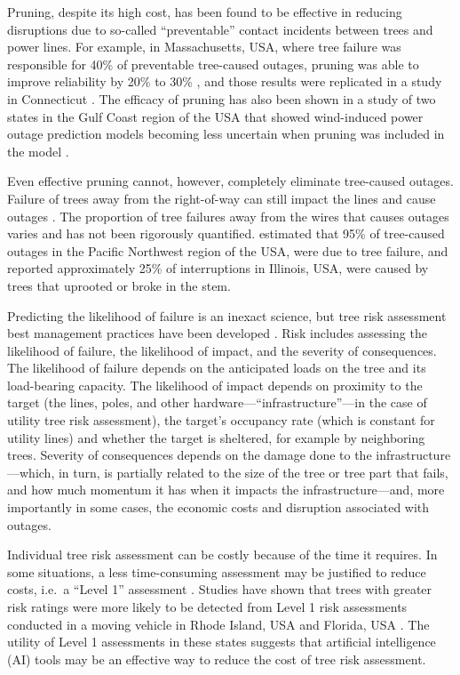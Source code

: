 \documentclass[Journal,letterpaper, SingleSpace, InsideFigs]{ascelike-new}
\begin{document}
Pruning, despite its high cost, has been found to be effective in reducing disruptions due to so-called ``preventable'' contact incidents between trees and power lines.  For example, in Massachusetts, USA, where tree failure was responsible for 40\% of preventable tree-caused outages, pruning was able to improve reliability by 20\% to 30\% \cite{simpson1996treecaused}, and those results were replicated in a study in Connecticut \cite{parent2019analysis}. The efficacy of pruning has also been shown in a study of two states in the Gulf Coast region of the USA that showed wind-induced power outage prediction models becoming less uncertain when pruning was included in the model \cite{nateghi2014power}.

Even effective pruning cannot, however, completely eliminate tree-caused outages. Failure of trees away from the right-of-way can still impact the lines and cause outages \cite{guggenmoos2003effects}. The proportion of tree failures away from the wires that causes outages varies and has not been rigorously quantified.  estimated that 95\% of tree-caused outages in the Pacific Northwest region of the USA, were due to tree failure, and  reported approximately 25\% of interruptions in Illinois, USA, were caused by trees that uprooted or broke in the stem. 


Predicting the likelihood of failure is an inexact science, but tree risk assessment best management practices have been developed \cite{smiley2017best,goodfellow2020best}. Risk includes assessing the likelihood of failure, the likelihood of impact, and the severity of consequences. The likelihood of failure depends on the anticipated loads on the tree and its load-bearing capacity. The likelihood of impact depends on proximity to the target (the lines, poles, and other hardware---``infrastructure''---in the case of utility tree risk assessment), the target’s occupancy rate (which is constant for utility lines) and whether the target is sheltered, for example by neighboring trees. Severity of consequences depends on the damage done to the infrastructure---which, in turn, is partially related to the size of the tree or tree part that fails, and how much momentum it has when it impacts the infrastructure---and, more importantly in some cases, the economic costs and disruption associated with outages.

Individual tree risk assessment can be costly because of the time it requires. In some situations, a less time-consuming assessment may be justified to reduce costs, i.e.\ a ``Level 1'' assessment  \cite{smiley2017best}. Studies have shown that trees with greater risk ratings were more likely to be detected from Level 1 risk assessments conducted in a moving vehicle in Rhode Island, USA \cite{rooney2005reliability} and Florida, USA \cite{koeser2016frequency}. The utility of Level 1 assessments in these states suggests that artificial intelligence (AI) tools may be an effective way to reduce the cost of tree risk assessment.
\end{document}
